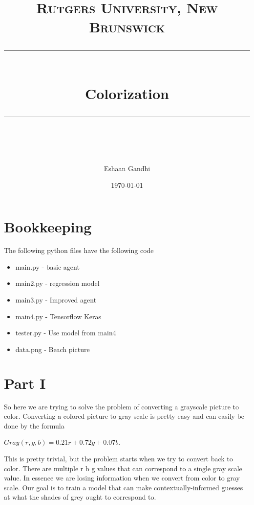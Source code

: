 \documentclass[12pt]{article} %
\title{	
	\normalfont\normalsize
	\textsc{Rutgers University, New Brunswick}\\ %
	\vspace{25pt} %
	\rule{\linewidth}{0.5pt}\\ %
	\vspace{20pt} %
	{\huge Colorization}\\ %
	\vspace{12pt} %
	\rule{\linewidth}{2pt}\\ %
	\vspace{12pt} %
}
\author{\LARGE Eshaan Gandhi} %
\date{\normalsize\today} %
\begin{document}
\maketitle %
\section{Bookkeeping}
The following python files have the following code
\begin{itemize}
\item main.py - basic agent
\item main2.py - regression model
\item main3.py - Improved agent
\item main4.py - Tensorflow Keras
\item tester.py - Use model from main4
\item data.png - Beach picture
\end{itemize}
\section{Part I}
So here we are trying to solve the problem of converting a grayscale picture to color. Converting a colored picture to gray scale is pretty easy and can easily be done by the formula
\begin{center}
$Gray(r, g, b) = 0.21r+0.72g+0.07b$. 
\end{center} 
This is pretty trivial, but the problem starts when we try to convert back to color. There are multiple r b g values that can correspond to a single gray scale value. In essence we are losing information when we convert from color to gray scale. Our goal is to train a model that can make contextually-informed guesses at what the shades of grey ought to correspond to. 
\end{document}
